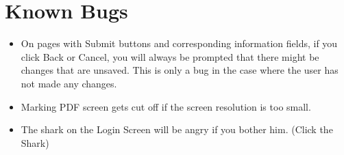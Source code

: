 \documentclass{article}
\begin{document}
\section{Known Bugs}
\begin{itemize}
\item On pages with Submit buttons and corresponding information fields, if you click Back or Cancel, you will always be prompted that there might be changes that are unsaved.  This is only a bug in the case where the user has not made any changes.
\item Marking PDF screen gets cut off if the screen resolution is too small.
\item The shark on the Login Screen will be angry if you bother him.  (Click the Shark)
\end{itemize}
\end{document}
